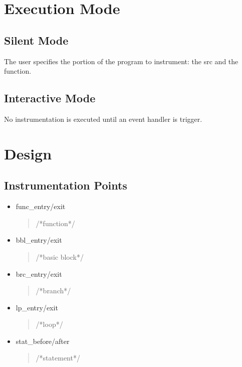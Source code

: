 \documentclass[a4paper,twocolumn,10pt]{article}
\def\denseitems{
  \itemsep1pt plus1pt minus1pt
  \parsep0pt plus0pt
  \parskip0pt\topsep0pt}
\begin{document}
\section{Execution Mode}
\subsection{Silent Mode}
The user specifies the portion of the program to instrument: the src and the function.

\subsection{Interactive Mode}
No instrumentation is executed until an event handler is trigger.

\section{Design}
\subsection{Instrumentation Points}
  \begin{itemize}\denseitems
    \item func\_entry/exit
    \begin{quote}
    /*function*/
    \end{quote}

    \item bbl\_entry/exit
    \begin{quote}
    /*basic block*/
    \end{quote}

    \item brc\_entry/exit
    \begin{quote}
    /*branch*/
    \end{quote}

    \item lp\_entry/exit
    \begin{quote}
    /*loop*/
    \end{quote}

    \item stat\_before/after
    \begin{quote}
    /*statement*/
    \end{quote}

  \end{itemize}
\end{document}

